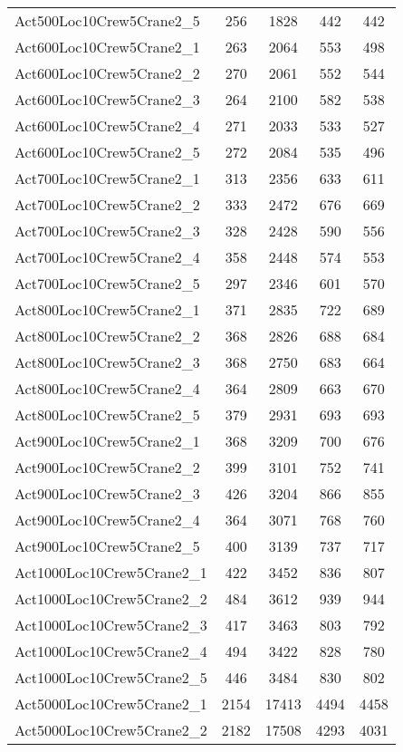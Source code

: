 \begin{center}
\begin{longtable}{ | l | c | c | c | c | }
Act500Loc10Crew5Crane2\_5	&	256	&	1828	&	442	&	442	\\
Act600Loc10Crew5Crane2\_1	&	263	&	2064	&	553	&	498	\\
Act600Loc10Crew5Crane2\_2	&	270	&	2061	&	552	&	544	\\
Act600Loc10Crew5Crane2\_3	&	264	&	2100	&	582	&	538	\\
Act600Loc10Crew5Crane2\_4	&	271	&	2033	&	533	&	527	\\
Act600Loc10Crew5Crane2\_5	&	272	&	2084	&	535	&	496	\\
Act700Loc10Crew5Crane2\_1	&	313	&	2356	&	633	&	611	\\
Act700Loc10Crew5Crane2\_2	&	333	&	2472	&	676	&	669	\\
Act700Loc10Crew5Crane2\_3	&	328	&	2428	&	590	&	556	\\
Act700Loc10Crew5Crane2\_4	&	358	&	2448	&	574	&	553	\\
Act700Loc10Crew5Crane2\_5	&	297	&	2346	&	601	&	570	\\
Act800Loc10Crew5Crane2\_1	&	371	&	2835	&	722	&	689	\\
Act800Loc10Crew5Crane2\_2	&	368	&	2826	&	688	&	684	\\
Act800Loc10Crew5Crane2\_3	&	368	&	2750	&	683	&	664	\\
Act800Loc10Crew5Crane2\_4	&	364	&	2809	&	663	&	670	\\
Act800Loc10Crew5Crane2\_5	&	379	&	2931	&	693	&	693	\\
Act900Loc10Crew5Crane2\_1	&	368	&	3209	&	700	&	676	\\
Act900Loc10Crew5Crane2\_2	&	399	&	3101	&	752	&	741	\\
Act900Loc10Crew5Crane2\_3	&	426	&	3204	&	866	&	855	\\
Act900Loc10Crew5Crane2\_4	&	364	&	3071	&	768	&	760	\\
Act900Loc10Crew5Crane2\_5	&	400	&	3139	&	737	&	717	\\
Act1000Loc10Crew5Crane2\_1	&	422	&	3452	&	836	&	807	\\
Act1000Loc10Crew5Crane2\_2	&	484	&	3612	&	939	&	944	\\
Act1000Loc10Crew5Crane2\_3	&	417	&	3463	&	803	&	792	\\
Act1000Loc10Crew5Crane2\_4	&	494	&	3422	&	828	&	780	\\
Act1000Loc10Crew5Crane2\_5	&	446	&	3484	&	830	&	802	\\
Act5000Loc10Crew5Crane2\_1	&	2154	&	17413	&	4494	&	4458	\\
Act5000Loc10Crew5Crane2\_2	&	2182	&	17508	&	4293	&	4031	\\

\end{longtable}
\end{center}
